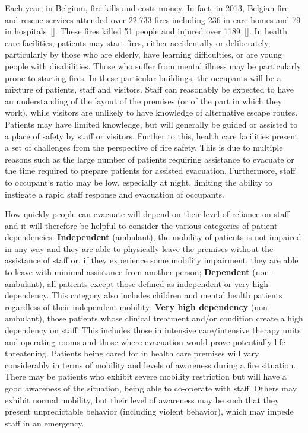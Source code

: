 \documentclass{style/llncs}
\begin{document}
\noindent{}Each year, in Belgium, fire kills and costs money. In fact, in 2013,
Belgian fire and rescue services attended over 22.733 fires including 236
in care homes and 79 in hospitals~[]. These fires killed 51
people and injured over 1189~[]. In health care facilities,
patients may start fires, either accidentally or deliberately,
particularly by those who are elderly, have learning difficulties, or are
young people with disabilities. Those who suffer from mental illness may
be particularly prone to starting fires. In these particular buildings,
the occupants will be a mixture of patients, staff and visitors. Staff
can reasonably be expected to have an understanding of the layout of the
premises (or of the part in which they work), while visitors are unlikely
to have knowledge of alternative escape routes. Patients may have limited
knowledge, but will generally be guided or assisted to a place of safety
by staff or visitors. Further to this, health care facilities present a
set of challenges from the perspective of fire safety. This is due to
multiple reasons such as the large number of patients requiring
assistance to evacuate or the time required to prepare patients for
assisted evacuation. Furthermore, staff to occupant's ratio may be low,
especially at night, limiting the ability to instigate a rapid staff
response and evacuation of occupants.%

How quickly people can evacuate will depend on their level of reliance on
staff and it will therefore be helpful to consider the various categories
of patient dependencies: \textbf{Independent} (ambulant), the mobility of
patients is not impaired in any way and they are able to physically leave
the premises without the assistance of staff or, if they experience some
mobility impairment, they are able to leave with minimal assistance from
another person; \textbf{Dependent} (non-ambulant), all patients except those
defined as independent or very high dependency. This category also
includes children and mental health patients regardless of their
independent mobility; \textbf{Very high dependency} (non-ambulant), those
patients whose clinical treatment and/or condition create a high
dependency on staff. This includes those in intensive care/intensive
therapy units and operating rooms and those where evacuation would prove
potentially life threatening. Patients being cared for in health care
premises will vary considerably in terms of mobility and levels of
awareness during a fire situation. There may be patients who exhibit
severe mobility restriction but will have a good awareness of the
situation, being able to co-operate with staff. Others may exhibit normal
mobility, but their level of awareness may be such that they present
unpredictable behavior (including violent behavior), which may impede
staff in an emergency.%
\end{document}
